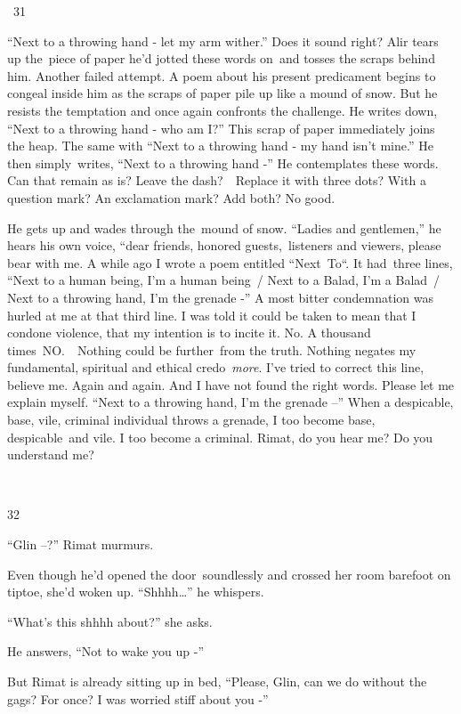 \documentclass[twoside,11pt]{book}
\begin{document}
\bigskip

~31 

``Next to a throwing hand - let my arm wither.'' Does it sound right? Alir tears up the~piece of paper he'd
jotted these words on{\ }and tosses the scraps behind him. Another failed
attempt.  A poem about his present predicament begins to congeal inside him as the scraps of paper pile up like a mound
of snow. But he resists the temptation and once again confronts the challenge. He writes down, ``Next to a
throwing hand - who am I?'' This scrap of paper immediately joins the heap. The same with
``Next to a throwing hand - my hand isn't mine.'' He then
simply{\ }writes, ``Next to a throwing hand -'' He
contemplates these words. Can that remain as is? Leave the dash?\ \ Replace it with three dots? With a question mark?
An exclamation mark? Add both? No good. 

He gets up and wades through the\ mound of snow. ``Ladies and gentlemen,'' he hears his own
voice, ``dear friends, honored guests,~listeners and viewers, please bear with me. A while ago I wrote a
poem entitled ``Next\ To``. It had~three lines, ``Next to a human being, I'm a
human being~/ Next to a Balad, I'm a Balad~/ Next to a throwing hand, I'm the grenade -'' A most bitter
condemnation was hurled at me at that  third line. I was told it could be taken to mean that I condone violence, that
my intention is to incite it. No. A thousand times~NO.\ \ Nothing could be further~from the truth. Nothing negates my
fundamental, spiritual and ethical credo\ \textit{more}. I've tried to correct this line, believe me. Again and again.
And I have not found the right words. Please let me explain myself. ``Next to a throwing hand, I'm the
grenade --'' When a despicable, base, vile, criminal individual throws a grenade, I too become base,
despicable{\ }and vile. I too become a criminal. Rimat, do you hear me? Do you
understand me?

~

32\ 

``Glin --?'' Rimat murmurs. 

Even though he'd opened the door\ soundlessly and crossed her room barefoot on tiptoe, she'd woken up.
``Shhhh{\dots}'' he whispers. 

``What{}'s this shhhh about?'' she asks.

He answers, ``Not to wake you up -'' 

But Rimat is already sitting up in bed, ``Please, Glin, can we do without the gags? For once? I was worried
stiff about you -'' 
\end{document}
